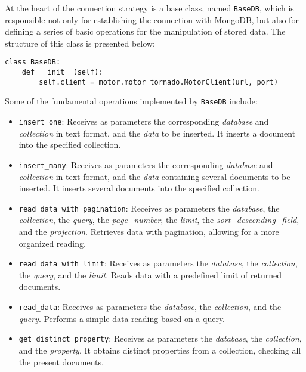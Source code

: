 At the heart of the connection strategy is a base class, named \texttt{BaseDB}, which is responsible not only for establishing the connection with MongoDB, but also for defining a series of basic operations for the manipulation of stored data. The structure of this class is presented below:

\begin{Verbatim}[fontsize=\small, baselinestretch=0.6]
class BaseDB:
    def __init__(self):
        self.client = motor.motor_tornado.MotorClient(url, port)
\end{Verbatim}

Some of the fundamental operations implemented by \texttt{BaseDB} include:

\begin{itemize}
    \item \texttt{insert\_one}: Receives as parameters the corresponding \textit{database} and \textit{collection} in text format, and the \textit{data} to be inserted. It inserts a document into the specified collection.
    
    \item \texttt{insert\_many}: Receives as parameters the corresponding \textit{database} and \textit{collection} in text format, and the \textit{data} containing several documents to be inserted. It inserts several documents into the specified collection.

    \item \texttt{read\_data\_with\_pagination}: Receives as parameters the \textit{database}, the \textit{collection}, the \textit{query}, the \textit{page\_number}, the \textit{limit}, the \textit{sort\_descending\_field}, and the \textit{projection}. Retrieves data with pagination, allowing for a more organized reading.
    
    \item \texttt{read\_data\_with\_limit}: Receives as parameters the \textit{database}, the \textit{collection}, the \textit{query}, and the \textit{limit}. Reads data with a predefined limit of returned documents.
    
    \item \texttt{read\_data}: Receives as parameters the \textit{database}, the \textit{collection}, and the \textit{query}. Performs a simple data reading based on a query.
    
    \item \texttt{get\_distinct\_property}: Receives as parameters the \textit{database}, the \textit{collection}, and the \textit{property}. It obtains distinct properties from a collection, checking all the present documents.
    

\end{itemize}
